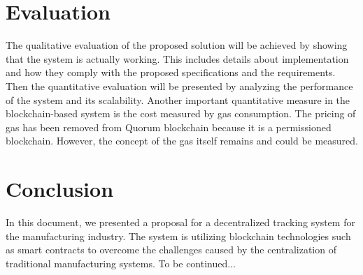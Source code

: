 \documentclass[runningheads]{llncs}
\begin{document}
\section{Evaluation}
The qualitative evaluation of the proposed solution will be achieved by showing that the system is actually working. This includes details about implementation and how they comply with the proposed specifications and the requirements. Then the quantitative evaluation will be presented by analyzing the performance of the system and its scalability. Another important quantitative measure in the blockchain-based system is the cost measured by gas consumption. The pricing of gas has been removed from Quorum blockchain because it is a permissioned blockchain. However, the concept of the gas itself remains and could be measured. 

\section{Conclusion}
In this document, we presented a proposal for a decentralized tracking system for the manufacturing industry. The system is utilizing blockchain technologies such as smart contracts to overcome the challenges caused by the centralization of traditional manufacturing systems. To be continued... 

\newpage


\end{document}
